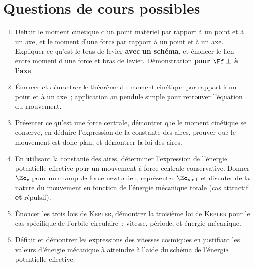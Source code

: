 \documentclass[a4paper, 12pt, final, garamond]{book}
\begin{document}
\section{Questions de cours possibles}
\begin{enumerate}[label=\sqenumi]
    \item Définir le moment cinétique d'un point matériel par rapport à un point
        et à un axe, et le moment d'une force par rapport à un point et à un
        axe. Expliquer ce qu'est le bras de levier \textbf{avec un schéma}, et
        énoncer le lien entre moment d'une force et bras de levier.
        Démonstration \textbf{pour $\Ff \perp$ à l'axe}.
    \item Énoncer et démontrer le théorème du moment cinétique par rapport à un
        point et à un axe~; application au pendule simple pour retrouver
        l'équation du mouvement.
    \item Présenter ce qu'est une force centrale, démontrer que le moment
        cinétique se conserve, en déduire l'expression de la constante des
        aires, prouver que le mouvement est donc plan, et démontrer la loi des
        aires.
    \item En utilisant la constante des aires, déterminer l'expression de
        l'énergie potentielle effective pour un mouvement à force centrale
        conservative. Donner $\Ec_p$ pour un champ de force newtonien, 
        représenter $\Ec_{p,\rm eff}$ et discuter de la nature du mouvement en
        fonction de l'énergie mécanique totale (cas attractif \textbf{et}
        répulsif).
    \item Énoncer les trois lois de \textsc{Kepler}, démontrer la troisième loi
        de \textsc{Kepler} pour le cas spécifique de l'orbite circulaire~:
        vitesse, période, et énergie mécanique.
    \item Définir et démontrer les expressions des vitesses cosmiques en
        justifiant les valeurs d'énergie mécanique à atteindre à l'aide du
        schéma de l'énergie potentielle effective.


\end{enumerate}
\end{document}

